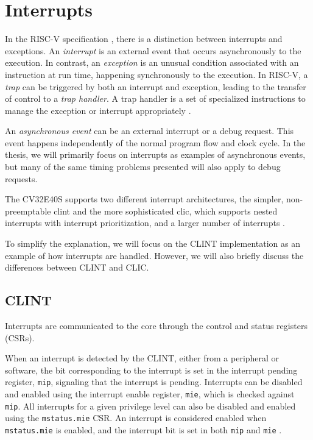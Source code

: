 \section{Interrupts}
\label{sec:bg_interrupts}

In the RISC-V specification \cite{watermanRISCVInstructionSet2021}, there is a distinction between interrupts and exceptions. An \textit{interrupt} is an external event that occurs asynchronously to the execution. In contrast, an \textit{exception} is an unusual condition associated with an instruction at run time, happening synchronously to the execution. In RISC-V, a \textit{trap} can be triggered by both an interrupt and exception, leading to the transfer of control to a \textit{trap handler}. A trap handler is a set of specialized instructions to manage the exception or interrupt appropriately \cite{watermanRISCVInstructionSet2021}. 

An \textit{asynchronous event} can be an external interrupt or a debug request. This event happens independently of the normal program flow and clock cycle. In the thesis, we will primarily focus on interrupts as examples of asynchronous events, but many of the same timing problems presented will also apply to debug requests.


The CV32E40S supports two different interrupt architectures, the simpler, non-preemptable \acrfull{clint} and the more sophisticated \acrfull{clic}, which supports nested interrupts with interrupt prioritization, and a larger number of interrupts \cite{openhwgroupExceptionsInterruptsCOREV2023}. 


To simplify the explanation, we will focus on the CLINT implementation as an example of how interrupts are handled. However, we will also briefly discuss the differences between CLINT and CLIC. 

\subsection{CLINT}
Interrupts are communicated to the core through the control and status registers (CSRs).

When an interrupt is detected by the CLINT, either from a peripheral or software, the bit corresponding to the interrupt is set in the interrupt pending register, \lstinline{mip}, signaling that the interrupt is pending.
Interrupts can be disabled and enabled using the interrupt enable register, \lstinline{mie}, which is checked against \lstinline{mip}. All interrupts for a given privilege level can also be disabled and enabled using the \lstinline{mstatus.mie} CSR. An interrupt is considered enabled when \lstinline{mstatus.mie} is enabled, and the interrupt bit is set in both \lstinline{mip} and \lstinline{mie} \cite{watermanRISCVInstructionSet2021}.

